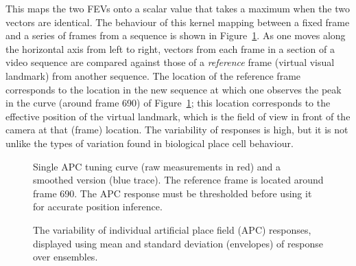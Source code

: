 This maps the two FEVs onto a scalar value that takes a maximum when the two vectors are identical. The behaviour of this kernel mapping between a fixed frame and a series of frames from a sequence is shown in Figure~\ref{fig:APCSingleNoisy}.  As one moves along the horizontal axis from left to right, vectors from each frame in a section of a video sequence are compared against those of a {\em reference} frame (virtual visual landmark) from another sequence.  The location of the reference frame corresponds to the location in the new sequence at which one observes the peak in the curve (around frame 690) of Figure~\ref{fig:APCSingleNoisy}; this location corresponds to the effective position of the virtual landmark, which is the field of view in front of the camera at that (frame) location.  The variability of responses is high, but it is not unlike the types of variation found in biological place cell behaviour.  


%		

\begin{figure}[t]
\centering
 \setlength{}
	\setlength{}
		
\caption{Single APC tuning curve (raw measurements in red) and a smoothed version (blue trace).  The reference frame is located around frame 690. The APC response must be thresholded before using it for accurate position inference.}
\label{fig:APCSingleNoisy}
\end{figure}


\begin{figure}
  \centering
  \setlength{}
  \setlength{}
  
  \caption{The variability of individual artificial place field (APC) responses, displayed using mean and standard deviation (envelopes) of response over ensembles.}
  \label{fig:APCVariability}
\end{figure}



